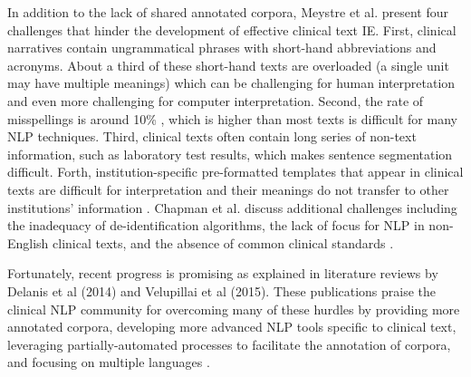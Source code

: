 \documentclass[sigconf]{acmart}
\begin{document}
In addition to the lack of shared annotated corpora, Meystre et al. present four challenges that hinder the development of effective clinical text IE. First, clinical narratives contain ungrammatical phrases with short-hand abbreviations and acronyms. About a third of these short-hand texts are overloaded (a single unit may have multiple meanings) which can be challenging for human interpretation and even more challenging for computer interpretation. Second, the rate of misspellings is around 10\% \cite{ruch2003using}, which is higher than most texts is difficult for many NLP techniques. Third, clinical texts often contain long series of non-text information, such as laboratory test results, which makes sentence segmentation difficult. Forth, institution-specific pre-formatted templates that appear in clinical texts are difficult for interpretation and their meanings do not transfer to other institutions' information \cite{meystre2008extracting}. Chapman et al. discuss additional challenges including the inadequacy of de-identification algorithms, the lack of focus for NLP in non-English clinical texts, and the absence of common clinical standards \cite{chapman2011overcoming}.

Fortunately, recent progress is promising as explained in literature reviews by Delanis et al (2014) and Velupillai et al (2015). These publications praise the clinical NLP community for overcoming many of these hurdles by providing more annotated corpora, developing more advanced NLP tools specific to clinical text, leveraging partially-automated processes to facilitate the annotation of corpora, and focusing on multiple languages \cite{dalianis2014didactic} \cite{velupillai2015recent}.
\end{document}
